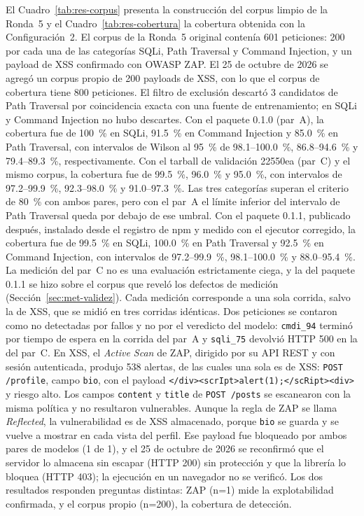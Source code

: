 El Cuadro~\ref{tab:res-corpus} presenta la construcción del corpus limpio de la Ronda~5 y el
Cuadro~\ref{tab:res-cobertura} la cobertura obtenida con la Configuración~2. El corpus de la
Ronda~5 original contenía 601 peticiones: 200 por cada una de las categorías SQLi, Path Traversal y
Command Injection, y un payload de XSS confirmado con OWASP ZAP. El 25 de octubre de 2026 se agregó
un corpus propio de 200 payloads de XSS, con lo que el corpus de cobertura tiene 800 peticiones.
El filtro de exclusión descartó 3 candidatos de Path Traversal por
coincidencia exacta con una fuente de entrenamiento; en SQLi y Command Injection no hubo descartes.
Con el paquete 0.1.0 (par~A), la cobertura fue de 100~\% en SQLi, 91.5~\% en Command Injection
y 85.0~\% en Path Traversal, con intervalos de Wilson \cite{wilson1927probable} al 95~\% de 98.1--100.0~\%, 86.8--94.6~\% y
79.4--89.3~\%, respectivamente. Con el tarball de validación 22550ea (par~C) y el mismo corpus, la
cobertura fue de 99.5~\%, 96.0~\% y 95.0~\%, con intervalos de 97.2--99.9~\%, 92.3--98.0~\% y
91.0--97.3~\%. Las tres categorías superan el criterio de 80~\% con ambos pares, pero con el par~A
el límite inferior del intervalo de Path Traversal queda por debajo de ese umbral. Con el paquete
0.1.1, publicado después, instalado desde el registro de npm y medido con el ejecutor corregido, la
cobertura fue de 99.5~\% en SQLi, 100.0~\% en Path Traversal y 92.5~\% en Command Injection, con
intervalos de 97.2--99.9~\%, 98.1--100.0~\% y 88.0--95.4~\%. La medición del par~C no es una
evaluación estrictamente ciega, y la del paquete 0.1.1 se hizo sobre el corpus que reveló los
defectos de medición (Sección~\ref{sec:met-validez}). Cada medición corresponde a una sola corrida, salvo la de XSS, que se midió en tres corridas idénticas.
Dos peticiones se contaron como no detectadas por fallos y no por el veredicto del modelo:
\texttt{cmdi\_94} terminó por tiempo de espera en la corrida del par~A y \texttt{sqli\_75} devolvió
HTTP 500 en la del par~C. En XSS, el \textit{Active Scan} de ZAP, dirigido por su API REST y con
sesión autenticada, produjo 538 alertas, de las cuales una sola es de XSS: \texttt{POST /profile},
campo \texttt{bio}, con el payload \texttt{</div><scrIpt>alert(1);</scRipt><div>} y riesgo alto.
Los campos \texttt{content} y \texttt{title} de \texttt{POST /posts} se escanearon con la misma
política y no resultaron vulnerables. Aunque la regla de ZAP se llama \textit{Reflected}, la
vulnerabilidad es de XSS almacenado, porque \texttt{bio} se guarda y se vuelve a mostrar en cada
vista del perfil. Ese payload fue bloqueado por ambos pares de modelos (1 de 1), y el 25 de octubre de 2026 se
reconfirmó que el servidor lo almacena sin escapar (HTTP 200) sin protección y que la librería lo
bloquea (HTTP 403); la ejecución en un navegador no se verificó. Los
dos resultados responden preguntas distintas: ZAP (n=1) mide la explotabilidad confirmada, y el
corpus propio (n=200), la cobertura de detección.

